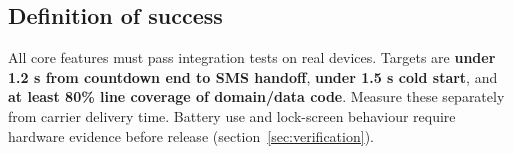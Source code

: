 \subsection{Definition of success}
All core features must pass integration tests on real devices. Targets are \textbf{under 1.2 s from countdown end to SMS handoff}, \textbf{under 1.5 s cold start}, and \textbf{at least 80\% line coverage of domain/data code}. Measure these separately from carrier delivery time. Battery use and lock-screen behaviour require hardware evidence before release (section~\ref{sec:verification}).

